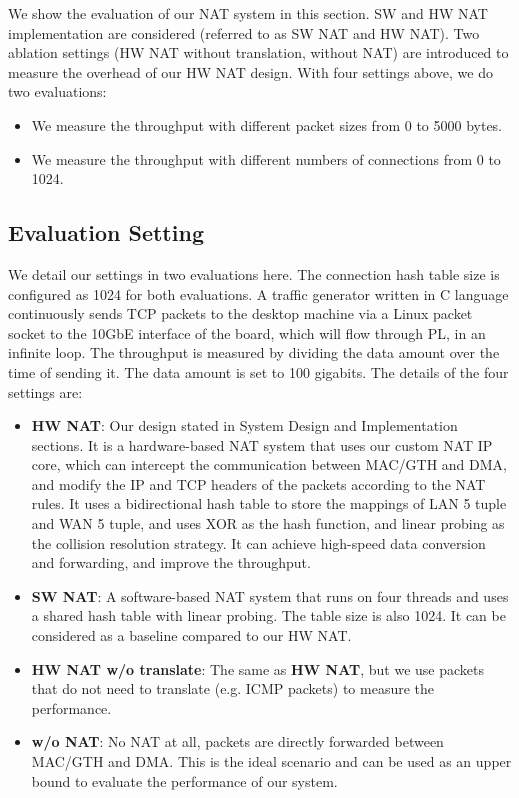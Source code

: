 We show the evaluation of our NAT system in this section.
SW and HW NAT implementation are considered (referred to as SW NAT and HW NAT). Two ablation settings (HW NAT without translation, without NAT) are introduced to measure the overhead of our HW NAT design.
With four settings above, we do two evaluations:
\begin{itemize}
    \item We measure the throughput with different packet sizes from 0 to 5000 bytes.
    \item We measure the throughput with different numbers of connections from 0 to 1024.
\end{itemize}


\subsection{Evaluation Setting}

We detail our settings in two evaluations here. The connection hash table size is configured as 1024 for both evaluations. A traffic generator written in C language continuously sends TCP packets to the desktop machine via a Linux packet socket to the 10GbE interface of the board, which will flow through PL, in an infinite loop. The throughput is measured by dividing the data amount over the time of sending it. The data amount is set to 100 gigabits.
The details of the four settings are:

\begin{itemize}
    \item {\textbf{HW NAT}}: Our design stated in System Design and Implementation sections. It is a hardware-based NAT system that uses our custom NAT IP core, which can intercept the communication between MAC/GTH and DMA, and modify the IP and TCP headers of the packets according to the NAT rules. It uses a bidirectional hash table to store the mappings of LAN 5 tuple and WAN 5 tuple, and uses XOR as the hash function, and linear probing as the collision resolution strategy. It can achieve high-speed data conversion and forwarding, and improve the throughput.
    \item {\textbf{SW NAT}}: A software-based NAT system that runs on four threads and uses a shared hash table with linear probing. The table size is also 1024. It can be considered as a baseline compared to our HW NAT.
    \item {\textbf{HW NAT w/o translate}}: The same as \textbf{HW NAT}, but we use packets that do not need to translate (e.g. ICMP packets) to measure the performance.
    \item {\textbf{w/o NAT}}: No NAT at all, packets are directly forwarded between MAC/GTH and DMA. This is the ideal scenario and can be used as an upper bound to evaluate the performance of our system.
\end{itemize}


